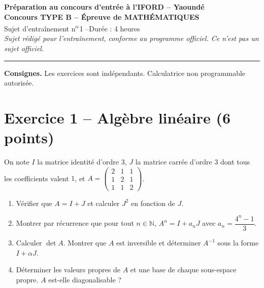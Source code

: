 \documentclass[11pt,a4paper]{article}
\begin{document}
\begin{center}
{\large\bfseries Préparation au concours d'entrée à l'IFORD -- Yaoundé}\\[2mm]
{\Large\bfseries Concours TYPE B -- Épreuve de MATHÉMATIQUES}\\[2mm]
Sujet d'entraînement n\textsuperscript{o}\,1 \quad --\quad Durée : 4 heures\\[1mm]
\emph{Sujet rédigé pour l'entraînement, conforme au programme officiel. Ce n'est pas un sujet officiel.}
\end{center}
\hrule\medskip

\noindent\textbf{Consignes.} Les exercices sont indépendants. Calculatrice non programmable autorisée.

\section*{Exercice 1 -- Algèbre linéaire (6 points)}
On note $I$ la matrice identité d'ordre 3, $J$ la matrice carrée d'ordre 3 dont tous les
coefficients valent $1$, et $A = \begin{pmatrix}2&1&1\\1&2&1\\1&1&2\end{pmatrix}$.
\begin{enumerate}
  \item Vérifier que $A = I + J$ et calculer $J^2$ en fonction de $J$.
  \item Montrer par récurrence que pour tout $n \in \mathbb{N}$, $A^n = I + a_n J$ avec $a_n = \dfrac{4^n - 1}{3}$.
  \item Calculer $\det A$. Montrer que $A$ est inversible et déterminer $A^{-1}$ sous la forme $I + \alpha J$.
  \item Déterminer les valeurs propres de $A$ et une base de chaque sous-espace propre. $A$ est-elle diagonalisable ?
\end{enumerate}
\end{document}
